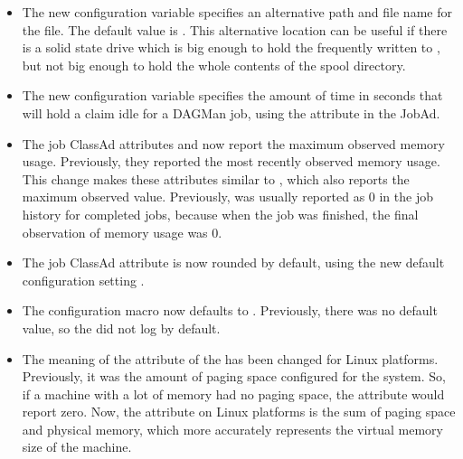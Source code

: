 \begin{itemize}

\item The new configuration variable  
specifies an alternative path and file name for the  file.
The default value is .
This alternative location can be
useful if there is a solid state drive which is big enough to hold the
frequently written to ,
but not big enough to hold the whole contents of the spool directory.

\item The new configuration variable 
specifies the amount of time in seconds that  will hold a claim
idle for a DAGMan job, using the  attribute in the JobAd.

\item The job ClassAd attributes
 and  now
report the maximum observed memory usage.  
Previously, they reported the most recently observed memory usage.  
This change makes these attributes similar to , 
which also reports the maximum observed value.  
Previously,  was
usually reported as 0 in the job history for completed jobs, because
when the job was finished, the final observation of memory usage
was 0.

\item The job ClassAd attribute  is now rounded 
by default,
using the new default configuration setting
.

\item The configuration macro  now defaults to
 .  Previously, there was no default value,
 so the  did not log by default.

\item The meaning of the  attribute of the  
has been changed for Linux platforms.
Previously, it was the amount of paging space configured for the system.
So, if a machine with a lot of memory had no paging space, 
the  attribute would report zero.
Now, the  attribute on Linux platforms 
is the sum of paging space and physical memory, 
which more accurately represents the virtual memory size of the machine.

\end{itemize}

